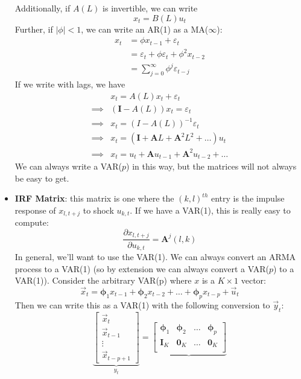\documentclass[12pt]{article}
\begin{document}
\begin{itemize}
    Additionally, if $A(L)$ is invertible, we can write
    \[x_t = B(L)u_t\]
    Further, if $|\phi| < 1$, we can write an AR(1) as a MA($\infty$):
    \[\begin{split}
        x_t &= \phi x_{t-1} + \varepsilon_t \\
        &= \varepsilon_t + \phi \varepsilon_t + \phi^2x_{t-2} \\
        &= \sum_{j=0}^{\infty}\phi^j\varepsilon_{t-j}
    \end{split}\]
    If we write with lags, we have
    \[\begin{split}
        &x_t = A(L)x_t + \varepsilon_t \\
        \implies &(\textbf{I}-A(L))x_t = \varepsilon_t \\
        \implies &x_t = \left(\textit{I}-A(L)\right)^{-1}\varepsilon_t \\
        \implies &x_t = (\textbf{I} + \textbf{A}L + \textbf{A}^2L^2 + \hdots)u_t \\
        \implies &x_t = u_t + \textbf{A}u_{t-1} + \textbf{A}^2u_{t-2} + \hdots 
    \end{split}\]
    We can always write a VAR($p$) in this way, but the matrices will not always be easy to get.
    \item \textbf{IRF Matrix}: this matrix is one where the $(k,l)^{th}$ entry is the impulse response of $x_{l,t+j}$ to shock $u_{k,t}$. If we have a VAR(1), this is really easy to compute:
    \[\frac{\partial x_{l, t+j}}{\partial u_{k,t}} = \textbf{A}^j(l,k)\]
    In general, we'll want to use the VAR(1). We can always convert an ARMA process to a VAR(1) (so by extension we can always convert a VAR($p$) to a VAR(1)). Consider the arbitrary VAR(p) where $x$ is a $K\times 1$ vector:
    \[\vec{x}_t = \boldsymbol{\phi}_1x_{t-1} + \boldsymbol{\phi}_2x_{t-2} + \hdots + \boldsymbol{\phi}_px_{t-p} + \vec{u}_t\]
    Then we can write this as a VAR(1) with the following conversion to $\vec{y}_t$:
    \[\underbrace{\begin{bmatrix}
    \vec{x}_t \\
    \vec{x}_{t-1} \\
    \vdots \\
    \vec{x}_{t-p+1}
    \end{bmatrix}}_{y_t} = \underbrace{\begin{bmatrix}
    \boldsymbol{\phi}_1 & \boldsymbol{\phi}_2 & \hdots & \boldsymbol{\phi}_p \\
    \textbf{I}_K & \textbf{0}_K & \hdots & \textbf{0}_K \\

\end{bmatrix}}\]
\end{itemize}
\end{document}
